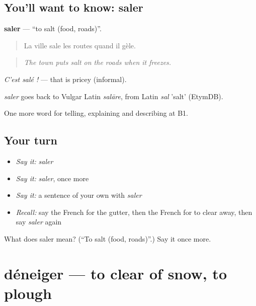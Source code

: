 \subsection*{You'll want to know: saler}
\textbf{saler} — \textquotedblleft{}to salt (food, roads)\textquotedblright{}.

\begin{quote}
La ville sale les routes quand il gèle.
\end{quote}

\begin{quote}
\emph{The town puts salt on the roads when it freezes.}
\end{quote}

\emph{C'est salé !} — that is pricey (informal).

\begin{cousinweb}
\emph{saler} goes back to Vulgar Latin \emph{salāre}, from Latin \emph{sal} 'salt' (EtymDB).
\end{cousinweb}

\begin{grammarlens}[title={What you've built}]
One more word for telling, explaining and describing at B1.
\end{grammarlens}

\subsection*{Your turn}
\begin{itemize}
\raggedright
  \item \emph{Say it:} \emph{saler}
  \item \emph{Say it:} \emph{saler}, once more
  \item \emph{Say it:} a sentence of your own with \emph{saler}
  \item \emph{Recall:} say the French for the gutter, then the French for to clear away, then say \emph{saler} again
\end{itemize}

\begin{tcolorbox}[breakable,colback=teal!4,colframe=teal!35!black,title={Before you move on}]
What does saler mean? (\textquotedblleft{}To salt (food, roads)\textquotedblright{}.) Say it once more.
\end{tcolorbox}
\section[déneiger]{déneiger — to clear of snow, to plough}

